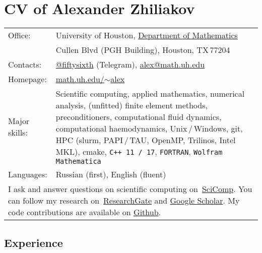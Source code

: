 \documentclass[a4paper,12pt]{article}
\begin{document}
	\section*{CV of Alexander Zhiliakov}
	
	\begin{longtable}{ l >{\raggedright\arraybackslash}p{15cm} }
		Office:			& University of Houston, \href{http://www.uh.edu/nsm/math/}{Department of Mathematics}\\
		\phantom{Summer 2018} & 3551 Cullen Blvd (PGH Building), Houston, TX\,77204\vspace{2mm}\\
		Contacts:		& \href{https://telegram.me/fiftysixth}{@fiftysixth} (Telegram), \href{mailto:alex@math.uh.edu}{alex@math.uh.edu}\vspace{2mm}\\
		Homepage:		& \href{https://www.math.uh.edu/~alex}{math.uh.edu/${\sim}$alex}\vspace{2mm}\\
		Major skills:	& Scientific computing, applied mathematics, numerical analysis, (unfitted) finite element methods, preconditioners, computational fluid dynamics, computational haemodynamics, Unix\,/\,Windows, git, HPC (slurm, PAPI\,/\,TAU, OpenMP, Trilinos, Intel MKL), cmake, \texttt{C++\,11\,/\,17}, \texttt{FORTRAN}, \texttt{Wolfram Mathematica}\vspace{2mm}\\
		Languages:		& Russian (first), English (fluent)\vspace{3mm}\\
		\multicolumn{2}{p{17cm}}{I ask and answer questions on scientific computing on~\href{https://scicomp.stackexchange.com/users/21916/56th}{SciComp}. You can follow my research on~\href{https://www.researchgate.net/profile/Alexander_Zhiliakov}{ResearchGate} and \href{https://scholar.google.com/citations?user=wchxEFUAAAAJ}{Google Scholar}. My code contributions are available on \href{https://github.com/56th}{Github}.}\\
	\end{longtable} 
	
	\subsection*{Experience}
	
\end{document}
